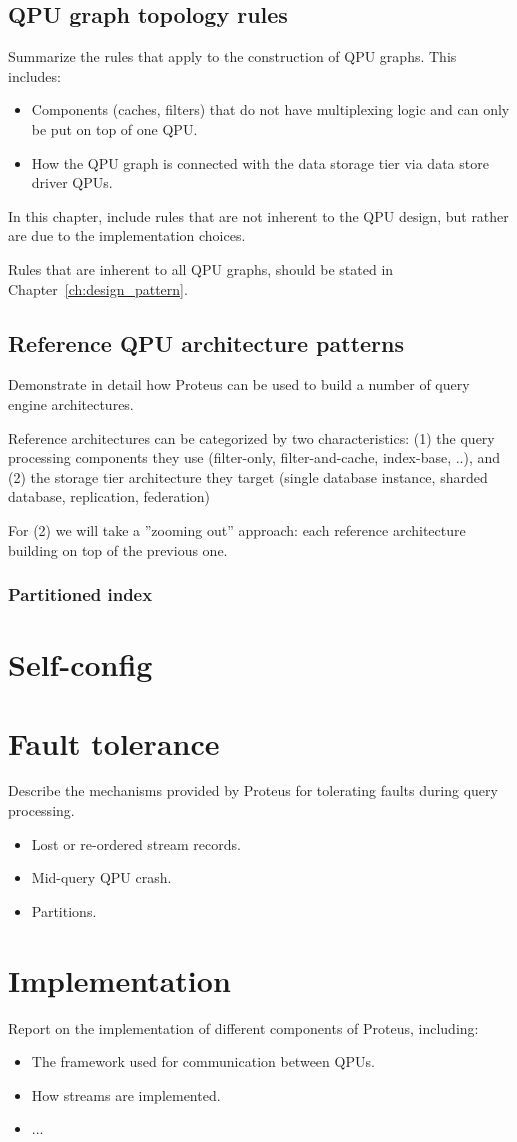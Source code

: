 \subsection{QPU graph topology rules}
Summarize the rules that apply to the construction of QPU graphs.
This includes:
\begin{itemize}
  \item Components (caches, filters) that do not have multiplexing logic and can
  only be put on top of one QPU.
  \item How the QPU graph is connected with the data storage tier via data store
  driver QPUs.
\end{itemize}

In this chapter, include rules that are not inherent to the QPU design, but
rather are due to the implementation choices.

Rules that are inherent to all QPU graphs, should be stated in
Chapter~\ref{ch:design_pattern}.


\subsection{Reference QPU architecture patterns}
Demonstrate in detail how Proteus can be used to build a number of query engine
architectures.

Reference architectures can be categorized by two characteristics: (1) the query
processing components they use (filter-only, filter-and-cache, index-base, ..),
and (2) the storage tier architecture they target (single database instance,
sharded database, replication, federation)

For (2) we will take a ''zooming out'' approach: each reference architecture
building on top of the previous one.

\subsubsection{Partitioned index}


\section{Self-config}


\section{Fault tolerance}
Describe the mechanisms provided by Proteus for tolerating faults during query
processing.
\begin{itemize}
  \item Lost or re-ordered stream records.
  \item Mid-query QPU crash.
  \item Partitions.
\end{itemize}

\section{Implementation}
Report on the implementation of different components of Proteus, including:
\begin{itemize}
  \item The framework used for communication between QPUs.
  \item How streams are implemented.
  \item ...
\end{itemize}
